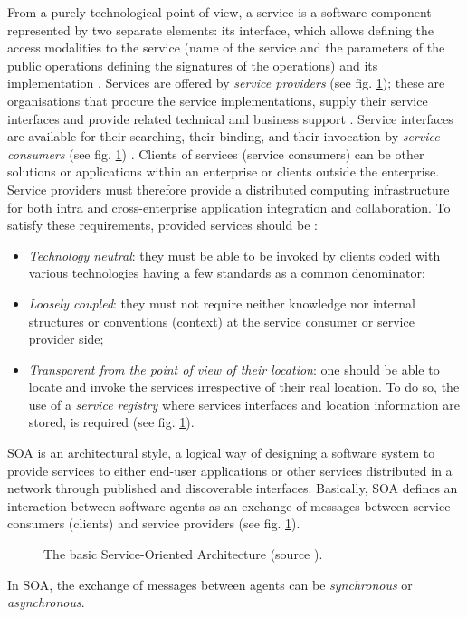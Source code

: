 From a purely technological point of view, a service is a software component represented by two separate elements: its interface, which allows defining the access modalities to the service (name of the service and the parameters of the public operations defining the signatures of the operations) and its implementation \cite{boukhedouma2015adaptation}. Services are offered by \textit{service providers} (see fig. \ref{chap1:fig:basic-soa}); these are organisations that procure the service implementations, supply their service interfaces and provide related technical and business support \cite{papazoglou2003service}. Service interfaces are available for their searching, their binding, and their invocation by \textit{service consumers} (see fig. \ref{chap1:fig:basic-soa}) \cite{mackenzie2006reference}. Clients of services (service consumers) can be other solutions or applications within an enterprise or clients outside the enterprise. Service providers must therefore provide a distributed computing infrastructure for both intra and cross-enterprise application integration and collaboration. To satisfy these requirements, provided services should be \cite{papazoglou2003service}:
\begin{itemize}
	\item \textit{Technology neutral}: they must be able to be invoked by clients coded with various technologies having a few standards as a common denominator;
	\item \textit{Loosely coupled}: they must not require neither knowledge nor internal structures or conventions (context) at the service consumer or service provider side;
	\item \textit{Transparent from the point of view of their location}: one should be able to locate and invoke the services irrespective of their real location. To do so, the use of a \textit{service registry} where services interfaces and location information are stored, is required (see fig. \ref{chap1:fig:basic-soa}).
\end{itemize}

SOA is an architectural style, a logical way of designing a software system to provide services to either end-user applications or other services distributed in a network through published and discoverable interfaces. Basically, SOA defines an interaction between software agents as an exchange of messages between service consumers (clients) and service providers (see fig. \ref{chap1:fig:basic-soa}).
\begin{figure}[ht!]
	\noindent
	\caption{The basic Service-Oriented Architecture (source \cite{papazoglou2003service}).}
	\label{chap1:fig:basic-soa}
\end{figure}
In SOA, the exchange of messages between agents can be \textit{synchronous} or \textit{asynchronous}.

